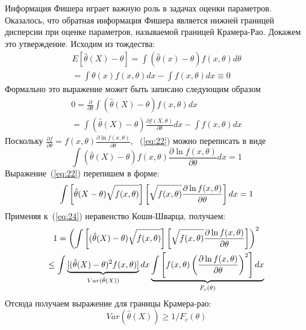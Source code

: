 Информация Фишера играет важную роль в задачах оценки параметров.
Оказалось, что обратная информация Фишера является нижней границей дисперсии при оценке параметров, называемой границей Крамера-Рао.
Докажем это утверждение.
%
Исходим из тождества:
%
\begin{multline}
    \label{eq:21}
        E[\hat{\theta}(X) - \theta] =
            \int(\hat{\theta}(x) - \theta)f(x,\theta)d\theta \\
                = \int\theta(x)f(x,\theta)dx - \int f(x,\theta)dx \equiv 0
\end{multline}
%
Формально это выражение может быть записано следующим образом
%
\begin{multline}
    \label{eq:22}
        0 = \frac{\partial}{\partial \theta}
            \int(\hat{\theta}(X) - \theta)f(x,\theta)dx \\
                = \int(\hat{\theta}(X) - \theta)
            \frac{\partial f(X, \theta)}{\partial \theta}dx -
        \int f(x,\theta)dx
\end{multline}
%
Поскольку $\frac{\partial f}{\partial \theta} = f(x,\theta)
    \frac{\partial \ln f(x,\theta)}{\partial \theta}$,
~(\ref{eq:22}) можно переписать в виде
%
\begin{equation}
    \label{eq:23}
        \int(\hat{\theta}(X) - \theta)
            f(x,\theta) \frac{\partial \ln f(x,\theta)}
        {\partial \theta}dx = 1
\end{equation}
%
Выражение~(\ref{eq:22}) перепишем в форме:
%
\begin{equation}
    \label{eq:24}
        \int \left[\hat{\theta}(X-\theta)\Large \sqrt{\mathstrut f(x,\theta)}\right]
            \left[\Large\sqrt{\mathstrut f(x,\theta)}
                \frac{\partial \ln f(x,\theta)}{\partial \theta}\right]dx = 1
\end{equation}
%
Применяя к~(\ref{eq:24}) неравенство Коши-Шварца, получаем:
%
\begin{multline}
    \label{eq:25}
        1 = \left(\int \left[(\hat{\theta}(X)-\theta)
            \Large \sqrt{\mathstrut f(x,\theta)}\right]
                \left[\Large \sqrt{\mathstrut f(x,\theta)}
                    \frac{\partial \ln f(x,\theta)}{\partial \theta} \right]
                \right)^2 \\
                \leq \int
            \underbrace{[(\hat{\theta}(X) - \theta)^2 f(x,\theta)]}_{Var(\hat{\theta}(X))}dx
        \underbrace{\int\left[f(x,\theta)\left(\frac{\partial \ln f(x,\theta)}
    {\partial \theta}\right)^2 \right]dx}_{F_c(\theta)}
\end{multline}
%
Отсюда получаем выражение для границы Крамера-рао:
%
\begin{equation}
    \label{eq:26}
        Var(\hat{\theta}(X)) \geq 1/{F_c (\theta)}
\end{equation}




